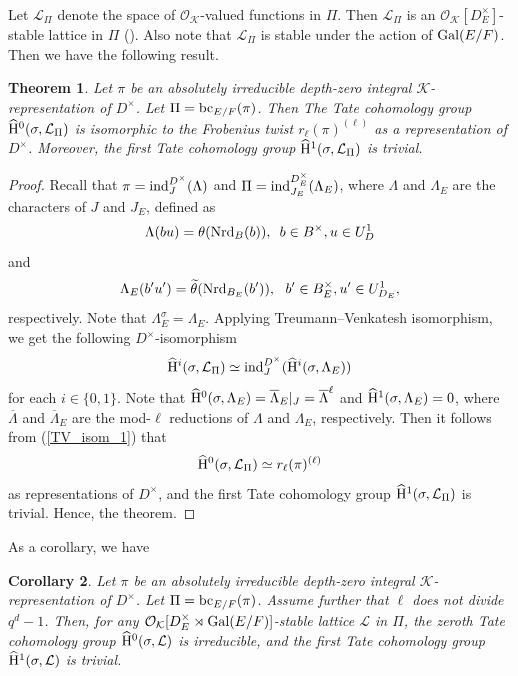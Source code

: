 \documentclass[10pt, reqno]{amsart}
\theoremstyle{plain}
\numberwithin{equation}{section}
\newtheorem{theorem}{Theorem}[section]
\newtheorem{corollary}[theorem]{Corollary}
\begin{document}
\subsubsection{}
Let $\mathcal{L}_{\Pi}$ denote the space of $\mathcal{O}_{\mathcal{K}}$-valued functions in $\Pi$. Then $\mathcal{L}_{\Pi}$ is an $\mathcal{O}_{\mathcal{K}}[D_E^\times]$-stable lattice in $\Pi$ (\cite[Proposition II.3]{Vigneras_Highest_Whittaker_model}). Also note that $\mathcal{L}_{\Pi}$ is stable under the action of ${\rm Gal}(E/F)$. Then we have the following result.
\begin{theorem}\label{main_thm}
Let $\pi$ be an absolutely irreducible depth-zero integral $\mathcal{K}$-representation of $D^\times$. Let $\Pi = {\rm bc}_{E/F}(\pi)$. Then The Tate cohomology group $\widehat{\rm H}^0(\sigma, \mathcal{L}_{\Pi})$ is isomorphic to the Frobenius twist $r_\ell(\pi)^{(\ell)}$ as a representation of $D^\times$. Moreover, the first Tate cohomology group $\widehat{\rm H}^1(\sigma,\mathcal{L}_{\Pi})$ is trivial.
\end{theorem}
\begin{proof}
Recall that $\pi = {\rm ind}_{J}^{D^\times}(\Lambda)$ and $\Pi = {\rm ind}_{J_E}^{D_E^\times}(\Lambda_E)$, where $\Lambda$ and $\Lambda_E$ are the characters of $J$ and $J_E$, defined as 
$$ \Lambda(bu) = \theta({\rm Nrd}_B(b)),\,\,\, b\in B^\times, u\in U_D^1 $$
and 
$$ \Lambda_E(b'u') = \widetilde{\theta}({\rm Nrd}_{B_E}(b')),\,\,\,\, b'\in B_E^\times, u'\in U_{D_E}^1, $$
respectively. Note that $\Lambda_E^\sigma = \Lambda_E$.
Applying Treumann--Venkatesh isomorphism, we get the following $D^\times$-isomorphism 
\begin{equation}\label{TV_isom_1}
\widehat{\rm H}^i(\sigma, \mathcal{L}_{\Pi}) \simeq {\rm ind}_{J}^{D^\times}(\widehat{\rm H}^i(\sigma,\Lambda_E)) 
\end{equation}
for each $i\in \{0,1\}$. Note that
$\widehat{\rm H}^0(\sigma,\Lambda_E) = \overline{\Lambda}_E|_{J} = \overline{\Lambda}^\ell$ and $\widehat{\rm H}^1(\sigma,\Lambda_E) = 0$, where $\overline{\Lambda}$ and $\overline{\Lambda}_E$ are the mod-$\ell$ reductions of $\Lambda$ and $\Lambda_E$, respectively. Then it follows from (\ref{TV_isom_1}) that 
$$ \widehat{\rm H}^0(\sigma,\mathcal{L}_{\Pi})\simeq r_\ell(\pi)^{(\ell)} $$
as representations of $D^\times$, and the first Tate cohomology group $\widehat{\rm H}^1(\sigma,\mathcal{L}_{\Pi})$ is trivial. Hence, the theorem.
\end{proof}
As a corollary, we have
\begin{corollary}
Let $\pi$ be an absolutely irreducible depth-zero integral $\mathcal{K}$-representation of $D^\times$. Let $\Pi = {\rm bc}_{E/F}(\pi)$. Assume further that $\ell$ does not divide $q^d-1$. Then, for any $\mathcal{O}_{\mathcal{K}}[D_E^\times\rtimes {\rm Gal}(E/F)]$-stable lattice $\mathcal{L}$ in $\Pi$, the zeroth Tate cohomology group $\widehat{\rm H}^0(\sigma, \mathcal{L})$ is irreducible, and the first Tate cohomology group $\widehat{\rm H}^1(\sigma,\mathcal{L})$ is trivial.
\end{corollary}
\end{document}
